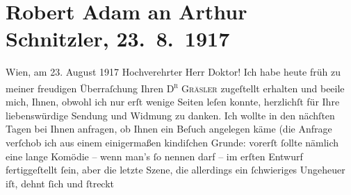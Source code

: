 

         \renewcommand{\erwaehnteOrte}{Orte: Wien}
         \renewcommand{\erwaehnteWerke}{Werke: Das Ende des Judas, Doktor Gräsler, Badearzt, Don Quijote}
               \section[Robert Adam an Arthur Schnitzler, 23. 8. 1917]{ Robert Adam an Arthur Schnitzler, 23. 8. 1917}\nopagebreak{}\rehead{ }\begin{ledgroupsized}[t]{13cm}\normalsize\beginnumbering \toendnotes[C]{\smallbreak\pagebreak[2]} 
\toendnotes[C]{\smallbreak}\pstart
           \raggedleft{}{\pb}Wien, am 23. August 1917\pend
           \pstart{}Hochverehrter Herr Doktor!\pend\pstart
           Ich habe heute früh zu meiner freudigen Überraſchung Ihren \textsc{D\textsuperscript{r}{ }Gräsler} zugeſtellt erhalten und beeile mich, Ihnen, obwohl ich nur erſt wenige Seiten
               leſen konnte, herzlichſt für Ihre liebenswürdige Sendung und Widmung zu danken.\pend
           \pstart
           Ich wollte in den nächſten Tagen bei Ihnen anfragen, ob Ihnen ein Beſuch angelegen
               käme (die Anfrage verſchob ich aus einem einigermaßen kindiſchen Grunde: vorerſt
               ſollte nämlich eine lange Komödie – wenn man’s ſo  nennen darf – im
               erſten Entwurf fertiggeſtellt ſein, aber die letzte Szene, die allerdings ein
               ſchwieriges Unge{\pb}heuer iſt, dehnt ſich und ſtreckt

\end{ledgroupsized}
